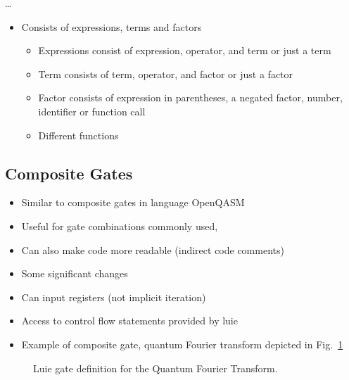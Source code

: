 \dots
\begin{itemize}
    \item Consists of expressions, terms and factors
    \begin{itemize}
        \item Expressions consist of expression, operator, and term or just a term
        \item Term consists of term, operator, and factor or just a factor
        \item Factor consists of expression in parentheses, a negated factor, number, identifier or function call
        \item Different functions
    \end{itemize}
\end{itemize}

\subsection{Composite Gates}
\label{sec:concept_compositeGates}
\begin{itemize}
    \item Similar to composite gates in language OpenQASM
    \item Useful for gate combinations commonly used,
    \item Can also make code more readable (indirect code comments)
    \item Some significant changes
    \item Can input registers (not implicit iteration)
    \item Access to control flow statements provided by luie
    \item Example of composite gate, quantum Fourier transform depicted in Fig.~\ref{fig:qft_example}
\end{itemize}

\begin{figure}[htp]
    \centering     
    
    \caption{Luie gate definition for the Quantum Fourier Transform.}
    \label{fig:qft_example}
\end{figure}